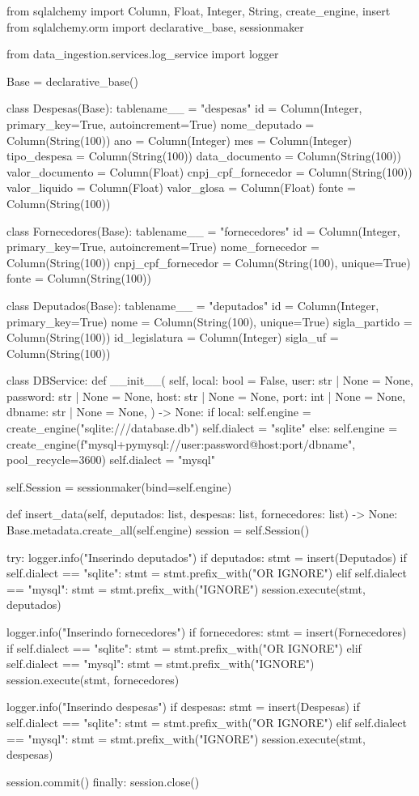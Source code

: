 \documentclass[12pt, a4paper]{article}
\begin{document}
\begin{python}
from sqlalchemy import Column, Float, Integer, String, create_engine, insert
from sqlalchemy.orm import declarative_base, sessionmaker

from data_ingestion.services.log_service import logger

Base = declarative_base()


class Despesas(Base):
	tablename__ = "despesas"
	id = Column(Integer, primary_key=True, autoincrement=True)
	nome_deputado = Column(String(100))
	ano = Column(Integer)
	mes = Column(Integer)
	tipo_despesa = Column(String(100))
	data_documento = Column(String(100))
	valor_documento = Column(Float)
	cnpj_cpf_fornecedor = Column(String(100))
	valor_liquido = Column(Float)
	valor_glosa = Column(Float)
	fonte = Column(String(100))


class Fornecedores(Base):
	tablename__ = "fornecedores"
	id = Column(Integer, primary_key=True, autoincrement=True)
	nome_fornecedor = Column(String(100))
	cnpj_cpf_fornecedor = Column(String(100), unique=True)
	fonte = Column(String(100))


class Deputados(Base):
	tablename__ = "deputados"
	id = Column(Integer, primary_key=True)
	nome = Column(String(100), unique=True)
	sigla_partido = Column(String(100))
	id_legislatura = Column(Integer)
	sigla_uf = Column(String(100))


class DBService:
	def __init__(
		self,
		local: bool = False,
		user: str | None = None,
		password: str | None = None,
		host: str | None = None,
		port: int | None = None,
		dbname: str | None = None,
	) -> None:
		if local:
			self.engine = create_engine("sqlite:///database.db")
			self.dialect = "sqlite"
		else:
			self.engine = create_engine(f"mysql+pymysql://{user}:{password}@{host}:{port}/{dbname}", pool_recycle=3600)
			self.dialect = "mysql"

		self.Session = sessionmaker(bind=self.engine)
	
	def insert_data(self, deputados: list, despesas: list, fornecedores: list) -> None:
		Base.metadata.create_all(self.engine)
		session = self.Session()
		
		try:
			logger.info("Inserindo deputados")
			if deputados:
				stmt = insert(Deputados)
				if self.dialect == "sqlite":
					stmt = stmt.prefix_with("OR IGNORE")
				elif self.dialect == "mysql":
					stmt = stmt.prefix_with("IGNORE")
				session.execute(stmt, deputados)
			
			logger.info("Inserindo fornecedores")
			if fornecedores:
				stmt = insert(Fornecedores)
				if self.dialect == "sqlite":
					stmt = stmt.prefix_with("OR IGNORE")
				elif self.dialect == "mysql":
					stmt = stmt.prefix_with("IGNORE")
				session.execute(stmt, fornecedores)
			
			logger.info("Inserindo despesas")
			if despesas:
				stmt = insert(Despesas)
				if self.dialect == "sqlite":
					stmt = stmt.prefix_with("OR IGNORE")
				elif self.dialect == "mysql":
					stmt = stmt.prefix_with("IGNORE")
				session.execute(stmt, despesas)
			
			session.commit()
		finally:
			session.close()
\end{python}
\end{document}
